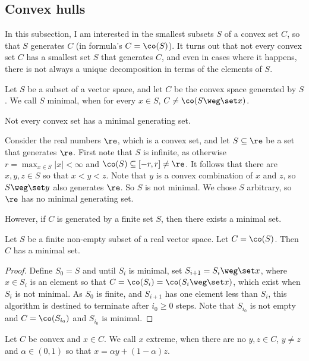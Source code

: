 \documentclass[12pt,a4paper]{article}
\begin{document}
\subsection{Convex hulls}

In this subsection, I am interested in the smallest subsets $S$ of a convex set $C$, so that $S$ generates $C$ (in formula's $C=\co(S)$). It turns out that not every convex set $C$ has a smallest set $S$ that generates $C$, and even in cases where it happens, there is not always a unique decomposition in terms of the elements of $S$.  

\begin{definition}
	Let $S$ be a subset of a vector space, and let $C$ be the convex space generated by $S$. We call $S$ minimal, when for every $x\in S$, $C\neq \co(S\weg\set x)$. 
\end{definition}

Not every convex set has a minimal generating set. 
\begin{example}
    Consider the real numbers $\re$, which is a convex set, and let $S\subseteq \re  $ be a set that generates  $\re$.
    First note that $S$ is infinite, as otherwise $r=\max_{x\in S}|x|<\infty$ and $\co(S)\subseteq[-r,r]\neq \re$. It follows that there are $x,y,z\in S$ so that  $x<y<z$. Note that $y$ is a convex combination of $x$ and $z$, so $S\weg\set y$ also generates $\re$. So $S$ is not minimal. We chose $S$ arbitrary, so $\re$ has no minimal generating set. 
\end{example}

However, if $C$ is generated by a finite set $S$, then there exists a minimal set. 
\begin{lemma}\label{lem:finitegeneratedconvexsethasminimalset}
    Let $S$ be a finite non-empty subset of a real vector space. Let $C=\co(S)$. Then $C$ has a minimal set.
\end{lemma}
\begin{proof}
    Define $S_0=S$ and until $S_i$ is minimal, set $S_{i+1}=S_{i}\weg\set x$, where $x\in S_i$ is an element so that $C=\co(S_i)=\co(S_i\weg\set x)$, which exist when $S_i$ is not minimal. As $S_0$ is finite, and $S_{i+1}$ has one element less than $S_i$, this algorithm is destined to terminate after $i_0\ge 0$ steps. Note that $S_{i_0}$ is not empty and $C=\co(S_{i_0})$ and $S_{i_0}$ is minimal. 
\end{proof}

\begin{definition}\label{def:extremeset}
	Let $C$ be convex and $x\in C$. We call $x$ extreme, when there are no $y,z\in C$, $y\neq z$ and $\alpha\in(0,1)$ so that $x=\alpha y+ (1-\alpha)z$. 
\end{definition}
\end{document}
